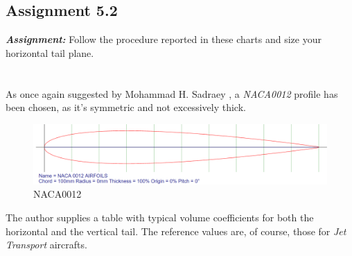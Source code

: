 \documentclass{article}
\begin{document}
\clearpage

\subsection{Assignment 5.2\label{Assignment_5.2}}

\textbf{\textit{Assignment:}} Follow the procedure reported in these charts
 and size your horizontal tail plane. \\ \\ \\ 

As once again suggested by Mohammad H. Sadraey \autocite{Sadraey_Mohammad}, a \textit{NACA0012} profile 
has been chosen, as it's symmetric and not excessively thick. \\ 

\begin{figure}[h!]
    \centering
    \includegraphics[width=\textwidth]{Sources/Plots_and_Pictures/NACA0012.png}
    \caption{NACA0012 \autocite{Airfoiltools}}
    \label{NACA0012}
\end{figure}


The author supplies a table with typical volume coefficients for both the horizontal and the vertical tail.
The reference values are, of course, those for \textit{Jet Transport} aircrafts.\\ 
\end{document}
